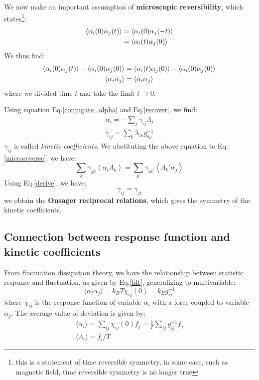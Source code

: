 \documentclass{article}
\begin{document}
We now make an important assumption of \textbf{microscopic reversibility}, which 
states\footnote{this is a statement of time reversible symmetry, in some case, such as 
magnetic field, time reversible symmetry is no longer true}:
\begin{align}
    \langle \alpha_i(0)\alpha_j(t) \rangle &= 
    \langle \alpha_i(0)\alpha_j(-t) \rangle \notag \\ 
    &= \langle \alpha_i(t)\alpha_j(0) \rangle
\end{align}
We thus find:
\begin{gather}
    \langle \alpha_i(0)\alpha_j(t) \rangle - \langle \alpha_i(0)\alpha_j(0) \rangle  
    = \langle \alpha_i(t)\alpha_j(0) \rangle - \langle \alpha_i(0)\alpha_j(0) \rangle   \notag \\
    \langle \alpha_i \dot{\alpha}_j \rangle = \langle \dot{\alpha}_i \alpha_j \rangle \label{microreverse}
\end{gather}
where we divided time $t$ and take the limit $t \to 0$.

Using equation Eq.\ref{conjugate_alpha} and Eq.\ref{recover}, we find:
\begin{gather}
    \dot{\alpha}_i = - \sum_{j} \gamma_{ij} \Lambda_j \label{recover2}\\
    \gamma_{ij} = \sum_k \lambda_{ik} g^{-1}_{kj}
\end{gather}
$\gamma_{ij}$ is called \emph{kinetic coefficients}. 
We ubstituting the above equation to Eq.\ref{microreverse}, we have:
\begin{equation}
    \sum_{k} \gamma_{jk} \left\langle \alpha_i \Lambda_k \right\rangle
    = \sum_{k'} \gamma_{ik'} \left\langle \Lambda_k' \alpha_j \right\rangle
\end{equation}
Using Eq.\ref{derive}, we have:
\begin{equation}
    \gamma_{ij} = \gamma_{ji}
\end{equation}
we obtain the \textbf{Onsager reciprocal relations}, which gives the symmetry of the 
kinetic coefficients.

\subsection{Connection between response function and kinetic coefficients}
From fluctuation dissipation theory, we have the relationship between statistic response 
and fluctuation, as given by Eq.\ref{fdt}, generalizing to multivariable:
\begin{equation}
    \langle \alpha_i \alpha_j \rangle = k_BT \chi_{ij}(0) = k_B g^{-1}_{ij}
\end{equation}
where $\chi_{ij}$ is the response function of variable $\alpha_i$ 
with a force coupled to variable $\alpha_j$. The average value of deviation is given by:
\begin{gather}
    \langle \alpha_i \rangle = \sum_{ij} \chi_{ij}(0) f_j = \frac{1}{T} \sum_{ij} g^{-1}_{ij} f_j \label{multilinear}\\
    \langle \Lambda_i \rangle = f_i / T
\end{gather}
\end{document}
